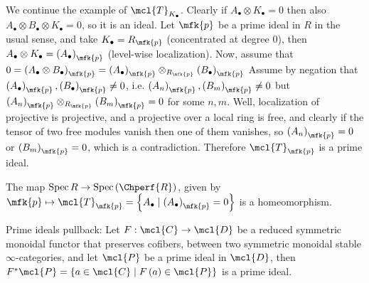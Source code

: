 \begin{example*}
	We continue the example of $\mcl{T}_{K_\bullet}$.
	Clearly if $A_\bullet \otimes K_\bullet = 0$ then also $A_\bullet \otimes B_\bullet \otimes K_\bullet = 0$, so it is an ideal.
	Let $\mfk{p}$ be a prime ideal in $R$ in the usual sense, and take $K_\bullet = R_\mfk{p}$ (concentrated at degree $0$),
	then $A_\bullet \otimes K_\bullet = \left(A_\bullet\right)_\mfk{p}$ (level-wise localization).
	Now, assume that
	$
	0
	= \left(A_\bullet \otimes B_\bullet\right)_\mfk{p}
	= \left(A_\bullet\right)_\mfk{p} \otimes_{R_\mfk{p}} \left(B_\bullet\right)_\mfk{p}
	$
	Assume by negation that $\left(A_\bullet\right)_\mfk{p}, \left(B_\bullet\right)_\mfk{p} \neq 0$,
	i.e. $\left(A_n\right)_\mfk{p}, \left(B_m\right)_\mfk{p} \neq 0$ but $\left(A_n\right)_\mfk{p} \otimes_{R_\mfk{p}} \left(B_m\right)_\mfk{p} = 0$ for some $n,m$.
	Well, localization of projective is projective, and a projective over a local ring is free, and clearly if the tensor of two free modules vanish then one of them vanishes, so $\left(A_n\right)_\mfk{p} = 0$ or $\left(B_m\right)_\mfk{p} = 0$, which is a contradiction.
	Therefore $\mcl{T}_\mfk{p}$ is a prime ideal.
\end{example*}

\begin{theorem}
	The map $\spec{R} \to \spec\left(\Chperf{R}\right)$,
	given by $\mfk{p} \mapsto \mcl{T}_\mfk{p} = \left\{ A_\bullet \mid \left(A_\bullet\right)_\mfk{p} = 0 \right\}$
	is a homeomorphism.
\end{theorem}

\begin{proposition}\label{primes-pullback}
	Prime ideals pullback:
	Let $F: \mcl{C} \to \mcl{D}$ be a reduced symmetric monoidal functor that preserves cofibers, between two symmetric monoidal stable $\infty$-categories,
	and let $\mcl{P}$ be a prime ideal in $\mcl{D}$, then $F^*\mcl{P} = \left\{ a \in \mcl{C} \mid F\left(a\right) \in \mcl{P} \right\}$ is a prime ideal.
\end{proposition}

